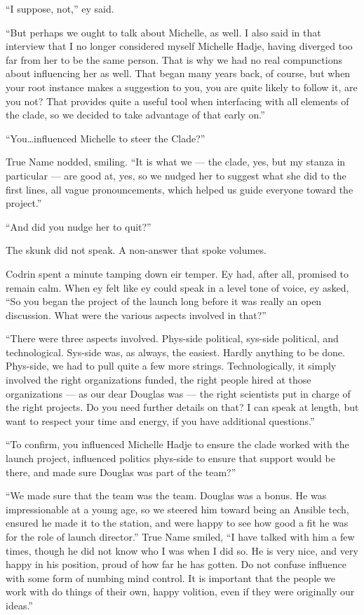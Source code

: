 ``I suppose, not,'' ey said.

``But perhaps we ought to talk about Michelle, as well. I also said in that interview that I no longer considered myself Michelle Hadje, having diverged too far from her to be the same person. That is why we had no real compunctions about influencing her as well. That began many years back, of course, but when your root instance makes a suggestion to you, you are quite likely to follow it, are you not? That provides quite a useful tool when interfacing with all elements of the clade, so we decided to take advantage of that early on.''

``You\ldots influenced Michelle to steer the Clade?''

True Name nodded, smiling. ``It is what we — the clade, yes, but my stanza in particular — are good at, yes, so we nudged her to suggest what she did to the first lines, all vague pronouncements, which helped us guide everyone toward the project.''

``And did you nudge her to quit?''

The skunk did not speak. A non-answer that spoke volumes.

Codrin spent a minute tamping down eir temper. Ey had, after all, promised to remain calm. When ey felt like ey could speak in a level tone of voice, ey asked, ``So you began the project of the launch long before it was really an open discussion. What were the various aspects involved in that?''

``There were three aspects involved. Phys-side political, sys-side political, and technological. Sys-side was, as always, the easiest. Hardly anything to be done. Phys-side, we had to pull quite a few more strings. Technologically, it simply involved the right organizations funded, the right people hired at those organizations — as our dear Douglas was — the right scientists put in charge of the right projects. Do you need further details on that? I can speak at length, but want to respect your time and energy, if you have additional questions.''

``To confirm, you influenced Michelle Hadje to ensure the clade worked with the launch project, influenced politics phys-side to ensure that support would be there, and made sure Douglas was part of the team?''

``We made sure that the team was the team. Douglas was a bonus. He was impressionable at a young age, so we steered him toward being an Ansible tech, ensured he made it to the station, and were happy to see how good a fit he was for the role of launch director.'' True Name smiled, ``I have talked with him a few times, though he did not know who I was when I did so. He is very nice, and very happy in his position, proud of how far he has gotten. Do not confuse influence with some form of numbing mind control. It is important that the people we work with do things of their own, happy volition, even if they were originally our ideas.''

